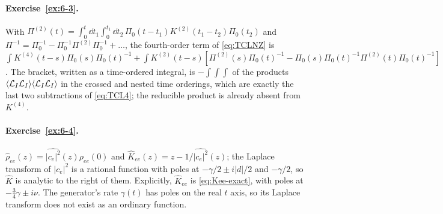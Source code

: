 \paragraph{Exercise~\ref{ex:6-3}.}
With $\Pi^{(2)}(t)=\int_0^t\dd t_1\int_0^{t_1}\dd t_2\,\Pi_0(t-t_1)K^{(2)}(t_1-t_2)\Pi_0(t_2)$ and $\Pi^{-1}=\Pi_0^{-1}-\Pi_0^{-1}\Pi^{(2)}\Pi_0^{-1}+\dots$, the fourth-order term of \cref{eq:TCLNZ} is $\int K^{(4)}(t-s)\Pi_0(s)\Pi_0(t)^{-1}+\int K^{(2)}(t-s)[\Pi^{(2)}(s)\Pi_0(t)^{-1}-\Pi_0(s)\Pi_0(t)^{-1}\Pi^{(2)}(t)\Pi_0(t)^{-1}]$.
The bracket, written as a time-ordered integral, is $-\int\int\int$ of the products $\langle\mathcal{L}_I\mathcal{L}_I\rangle\langle\mathcal{L}_I\mathcal{L}_I\rangle$ in the crossed and nested time orderings, which are exactly the last two subtractions of \cref{eq:TCL4}; the reducible product is already absent from $K^{(4)}$.

\paragraph{Exercise~\ref{ex:6-4}.}
$\hat\rho_{ee}(z)=\widehat{|c_e|^2}(z)\rho_{ee}(0)$ and $\hat K_{ee}(z)=z-1/\widehat{|c_e|^2}(z)$; the Laplace transform of $|c_e|^2$ is a rational function with poles at $-\gamma/2\pm i|d|/2$ and $-\gamma/2$, so $\hat K$ is analytic to the right of them.
Explicitly, $\hat K_{ee}$ is \cref{eq:Kee-exact}, with poles at $-\tfrac34\gamma\pm i\nu$.
The generator's rate $\gamma(t)$ has poles on the real $t$ axis, so its Laplace transform does not exist as an ordinary function.

